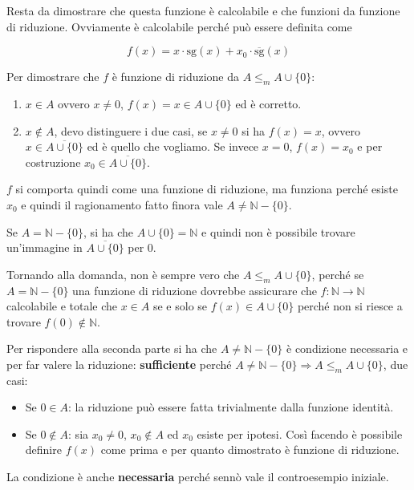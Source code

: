 Resta da dimostrare che questa funzione è calcolabile e che funzioni da funzione di riduzione.
Ovviamente è calcolabile perché può essere definita come

$$
f(x) = x \cdot \text{sg}(x) + x_0 \cdot  \overline{\text{sg}}(x)
$$

Per dimostrare che $f$ è funzione di riduzione da $A \leq_m A \cup \{0\}$:

\begin{enumerate}
	\item $x \in A$ ovvero $x \neq 0$, $f(x) = x \in A\cup\{0\}$ ed è corretto.
	\item $x \notin A$, devo distinguere i due casi, se $x \neq 0$ si ha $f(x) = x$, ovvero $x \in \overline{A \cup \{0\}} $ ed è quello che vogliamo. Se invece $x = 0$, $f(x) = x_0$ e per costruzione $x_0 \in \overline{A \cup \{0\}}$.
\end{enumerate}

$f$ si comporta quindi come una funzione di riduzione, ma funziona perché esiste $x_0$ e quindi il ragionamento fatto finora vale $A \neq \mathbb{N}  - \{0\}$.

Se $A = \mathbb{N}  - \{0\}$, si ha che $A \cup \{0\} = \mathbb{N}$ e quindi non è possibile trovare un'immagine in $\overline{A \cup \{0\}}$ per $0$.

Tornando alla domanda, non è sempre vero che $A \leq_m A \cup \{0\}$, perché se $A = \mathbb{N}-\{0\}$ una funzione di riduzione dovrebbe assicurare che $f : \mathbb{N} \rightarrow \mathbb{N}$ calcolabile e totale che $x \in A$ se e solo se $f(x) \in A \cup \{0\}$ perché non si riesce a trovare $f(0) \notin \mathbb{N}$.

Per rispondere alla seconda parte si ha che $A \neq \mathbb{N} - \{0\}$ è condizione necessaria e \textbf{} per far valere la riduzione: \textbf{sufficiente} perché $A \neq \mathbb{N} - \{0\} \Rightarrow A \leq_m A \cup \{0\}$, due casi:

\begin{itemize}
	\item Se $0 \in A$: la riduzione può essere fatta trivialmente dalla funzione identità.
	\item Se $0 \notin A $: sia $x_0 \neq 0$, $x_0 \notin A$ ed $x_0$ esiste per ipotesi. Così facendo è possibile definire $f(x)$ come prima e per quanto dimostrato è funzione di riduzione. 
\end{itemize}

La condizione è anche \textbf{necessaria} perché sennò vale il controesempio iniziale.

